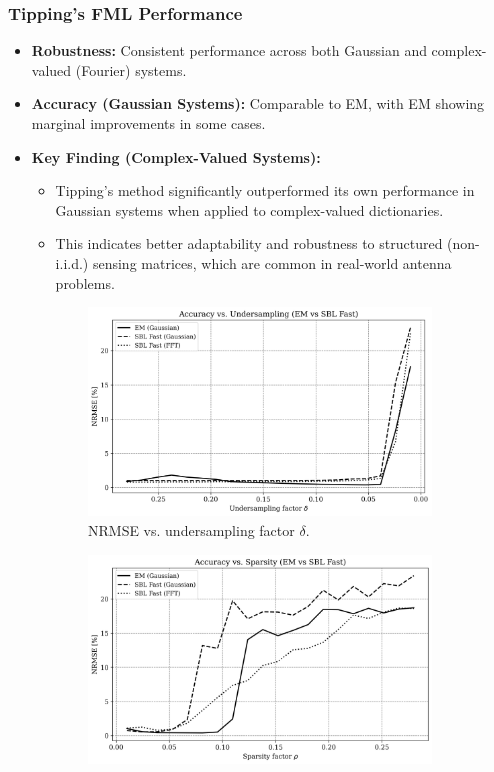 \documentclass{beamer}
\begin{document}
\begin{frame}
    \frametitle{Tipping's FML Performance}
    \begin{itemize}
        \item \textbf{Robustness:} Consistent performance across both Gaussian and complex-valued (Fourier) systems.
        \item \textbf{Accuracy (Gaussian Systems):} Comparable to EM, with EM showing marginal improvements in some cases.
        \item \textbf{Key Finding (Complex-Valued Systems):}
        \begin{itemize}
            \item Tipping's method significantly outperformed its own performance in Gaussian systems when applied to complex-valued dictionaries.
            \item This indicates better adaptability and robustness to structured (non-i.i.d.) sensing matrices, which are common in real-world antenna problems.
        \end{itemize}
    \end{itemize}
    \begin{figure}[h!]
        \centering
        \begin{subfigure}[b]{0.48\textwidth}
            \includegraphics[width=\textwidth]{Figures/accuracy_vs_undersampling_EMvsSB_woEMFFT.png}
            \caption{NRMSE vs. undersampling factor $\delta$.}
        \end{subfigure}
        \hfill
        \begin{subfigure}[b]{0.48\textwidth}
            \includegraphics[width=\textwidth]{Figures/accuracy_vs_sparsity_EMvsSB_woEMFFT.png}

\end{subfigure}
\end{figure}
\end{frame}
\end{document}
